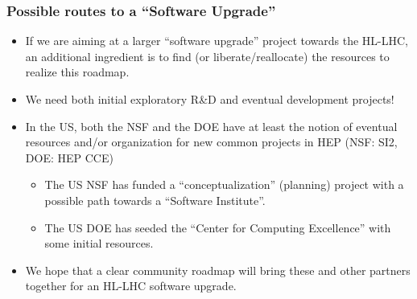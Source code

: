 \begin{frame}
\frametitle{Possible routes to a ``Software Upgrade''}

\begin{itemize}
\item If we are aiming at a larger ``software upgrade'' project towards the HL-LHC, an additional ingredient is to find (or liberate/reallocate) the resources to realize this roadmap. 
\item We need both initial exploratory R\&D and eventual development projects!
\item In the US, both the NSF and the DOE have at least the notion of eventual resources and/or organization for new common projects in HEP (NSF: SI2, DOE: HEP CCE)
  \begin{itemize}
   \item The US NSF has funded a ``conceptualization'' (planning) project with a possible path towards a ``Software Institute''.
   \item The US DOE has seeded the ``Center for Computing Excellence'' with some initial resources. 
  \end{itemize}
\item We hope that a clear community roadmap will bring these and other partners together for an HL-LHC software upgrade.
\end{itemize}

\end{frame}



